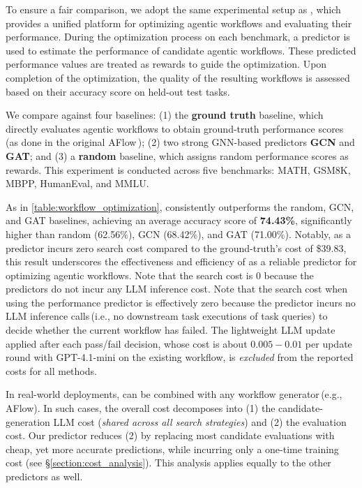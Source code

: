 To ensure a fair comparison, we adopt the same experimental setup as \citet{FLORA_Bench_25}, which provides a unified platform for optimizing agentic workflows and evaluating their performance. During the optimization process on each benchmark, a predictor is used to estimate the performance of candidate agentic workflows. These predicted performance values are treated as rewards to guide the optimization. Upon completion of the optimization, the quality of the resulting workflows is assessed based on their accuracy score on held-out test tasks.

We compare \ours{} against four baselines: (1) the \textbf{ground truth} baseline, which directly evaluates agentic workflows to obtain ground-truth performance scores (as done in the original AFlow\,\citep{AFlow_ICLR_25}); (2) two strong GNN-based predictors \textbf{GCN} and \textbf{GAT}; and (3) a \textbf{random} baseline, which assigns random performance scores as rewards. This experiment is conducted across five benchmarks: MATH, GSM8K, MBPP, HumanEval, and MMLU.

As in \autoref{table:workflow_optimization}, \ours{} consistently outperforms the random, GCN, and GAT baselines, achieving an average accuracy score of \textbf{74.43\%}, significantly higher than random (62.56\%), GCN (68.42\%), and GAT (71.00\%). Notably, as a predictor incurs zero search cost compared to the ground-truth's cost of \$39.83, this result underscores the effectiveness and efficiency of \ours{} as a reliable predictor for optimizing agentic workflows. Note that the search cost is $0$ because the predictors do not incur any LLM inference cost. Note that the search cost when using the performance predictor is effectively zero because the predictor incurs no LLM inference calls\,(i.e., no downstream task executions of task queries) to decide whether the current workflow has failed. The lightweight LLM update applied after each pass/fail decision, whose cost is about $0.005-0.01$ per update round with GPT-4.1-mini on the existing workflow, is \emph{excluded} from the reported costs for all methods.

In real-world deployments, \ours{} can be combined with any workflow generator\,(e.g., AFlow). In such cases, the overall cost decomposes into (1) the candidate-generation LLM cost (\emph{shared across all search strategies}) and (2) the evaluation cost. Our predictor reduces (2) by replacing most candidate evaluations with cheap, yet more accurate predictions, while incurring only a one-time training cost (see \S\ref{section:cost_analysis}). This analysis applies equally to the other predictors as well.




